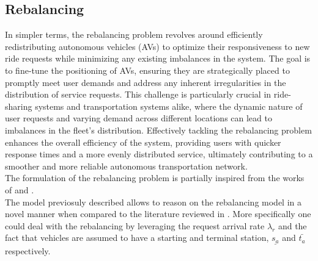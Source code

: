 \subsection{Rebalancing}
In simpler terms, the rebalancing problem revolves around efficiently redistributing autonomous vehicles (AVs) to optimize their responsiveness to new ride requests while minimizing any existing imbalances in the system. The goal is to fine-tune the positioning of AVs, ensuring they are strategically placed to promptly meet user demands and address any inherent irregularities in the distribution of service requests. This challenge is particularly crucial in ride-sharing  systems and transportation systems alike, where the dynamic nature of user requests and varying demand across different locations can lead to imbalances in the fleet's distribution. Effectively tackling the rebalancing problem enhances the overall efficiency of the system, providing users with quicker response times and a more evenly distributed service, ultimately contributing to a smoother and more reliable autonomous transportation network. \\
The formulation of the rebalancing problem is partially inspired from the works of  and .  \\
The model previosuly described allows to reason on the rebalancing model in a novel manner when compared to the literature reviewed in . More specifically one could deal with the rebalancing by leveraging the request arrival rate $\lambda_r$ and the fact that vehicles are assumed to have a starting and terminal station, $\underline{s_a}$ and $\bar{t_a}$ respectively. \\


